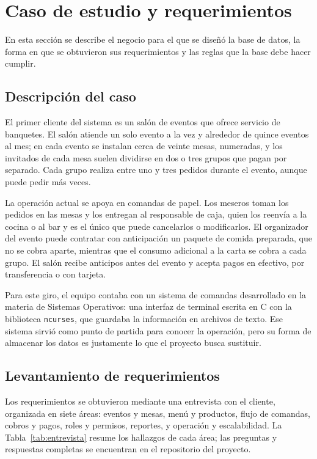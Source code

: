 \newpage

\section{Caso de estudio y requerimientos}
\label{sec:caso-de-estudio}

En esta sección se describe el negocio para el que se diseñó la base de datos, la forma en que se obtuvieron sus requerimientos y las reglas que la base debe hacer cumplir.

\subsection{Descripción del caso}

El primer cliente del sistema es un salón de eventos que ofrece servicio de banquetes. El salón atiende un solo evento a la vez y alrededor de quince eventos al mes; en cada evento se instalan cerca de veinte mesas, numeradas, y los invitados de cada mesa suelen dividirse en dos o tres grupos que pagan por separado. Cada grupo realiza entre uno y tres pedidos durante el evento, aunque puede pedir más veces.

La operación actual se apoya en comandas de papel. Los meseros toman los pedidos en las mesas y los entregan al responsable de caja, quien los reenvía a la cocina o al bar y es el único que puede cancelarlos o modificarlos. El organizador del evento puede contratar con anticipación un paquete de comida preparada, que no se cobra aparte, mientras que el consumo adicional a la carta se cobra a cada grupo. El salón recibe anticipos antes del evento y acepta pagos en efectivo, por transferencia o con tarjeta.

Para este giro, el equipo contaba con un sistema de comandas desarrollado en la materia de Sistemas Operativos: una interfaz de terminal escrita en C con la biblioteca \texttt{ncurses}, que guardaba la información en archivos de texto. Ese sistema sirvió como punto de partida para conocer la operación, pero su forma de almacenar los datos es justamente lo que el proyecto busca sustituir.

\subsection{Levantamiento de requerimientos}

Los requerimientos se obtuvieron mediante una entrevista con el cliente, organizada en siete áreas: eventos y mesas, menú y productos, flujo de comandas, cobros y pagos, roles y permisos, reportes, y operación y escalabilidad. La Tabla~\ref{tab:entrevista} resume los hallazgos de cada área; las preguntas y respuestas completas se encuentran en el repositorio del proyecto.


